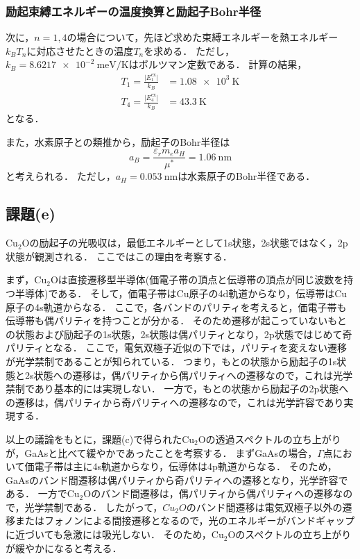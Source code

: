\documentclass[titlepage]{jsarticle}
\begin{document}
\subsubsection{励起束縛エネルギーの温度換算と励起子Bohr半径}
次に，$n=1,4$の場合について，先ほど求めた束縛エネルギーを熱エネルギー$k_BT_n$に対応させたときの温度$T_n$を求める．
ただし，$k_B=\SI{8.6217e-2}{\meV\per\kelvin}$はボルツマン定数である．
計算の結果，
\begin{align}
  T_1 = \frac{\lvert E_1^{\mathrm{ex}}\rvert}{k_B} &= \SI{1.08e3}{\kelvin} \\
  T_4 = \frac{\lvert E_4^{\mathrm{ex}}\rvert}{k_B} &= \SI{43.3}{\kelvin}
\end{align}
となる．

また，水素原子との類推から，励起子のBohr半径は
\begin{equation}
  a_B = \frac{\varepsilon_r m_e a_H}{\mu^*} = \SI{1.06}{\nm}
\end{equation}
と考えられる．
ただし，$a_H=\SI{0.053}{\nm}$は水素原子のBohr半径である．

\subsection{課題(e)}
Cu$_2$Oの励起子の光吸収は，最低エネルギーとして1s状態，2s状態ではなく，2p状態が観測される．
ここではこの理由を考察する．

まず，Cu$_2$Oは直接遷移型半導体(価電子帯の頂点と伝導帯の頂点が同じ波数を持つ半導体)である．
そして，価電子帯はCu原子の4d軌道からなり，伝導帯はCu原子の4s軌道からなる．
ここで，各バンドのパリティを考えると，価電子帯も伝導帯も偶パリティを持つことが分かる．
そのため遷移が起こっていないもとの状態および励起子の1s状態，2s状態は偶パリティとなり，2p状態ではじめて奇パリティとなる．
ここで，電気双極子近似の下では，パリティを変えない遷移が光学禁制であることが知られている．
つまり，もとの状態から励起子の1s状態と2s状態への遷移は，偶パリティから偶パリティへの遷移なので，これは光学禁制であり基本的には実現しない．
一方で，もとの状態から励起子の2p状態への遷移は，偶パリティから奇パリティへの遷移なので，これは光学許容であり実現する．

以上の議論をもとに，課題(c)で得られたCu$_2$Oの透過スペクトルの立ち上がりが，GaAsと比べて緩やかであったことを考察する．
まずGaAsの場合，$\Gamma$点において価電子帯は主に4s軌道からなり，伝導体は4p軌道からなる．
そのため，GaAsのバンド間遷移は偶パリティから奇パリティへの遷移となり，光学許容である．
一方でCu$_2$Oのバンド間遷移は，偶パリティから偶パリティへの遷移なので，光学禁制である．
したがって，$Cu_2O$のバンド間遷移は電気双極子以外の遷移またはフォノンによる間接遷移となるので，光のエネルギーがバンドギャップに近づいても急激には吸光しない．
そのため，Cu$_2$Oのスペクトルの立ち上がりが緩やかになると考える．
\end{document}
